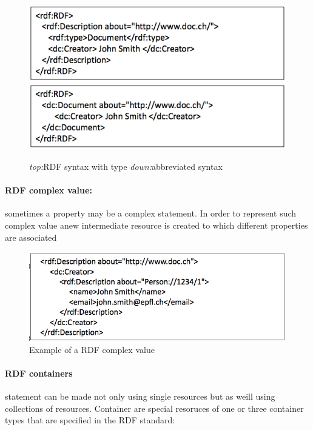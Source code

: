 \begin{figure}[H]
\begin{center}
\includegraphics[width=\textwidth]{figures/type.png}
\includegraphics[width= \textwidth]{figures/abbr.png}
\end{center}
\caption{\textit{top:}RDF syntax with type \textit{down:}abbreviated syntax}
\end{figure}

\paragraph{RDF complex value:} sometimes a property may be a complex statement. In order to represent such complex value anew intermediate resource is created to which different properties are associated

\begin{figure}[H]
\begin{center}
\includegraphics[width=\textwidth]{figures/complexRDF.png}
\end{center}
\caption{Example of a RDF complex value}
\end{figure}

\paragraph{RDF containers}statement can be made not only using single resources but  as weill using collections of resources. Container are special resoruces of one or three container types that are specified in the RDF standard:

